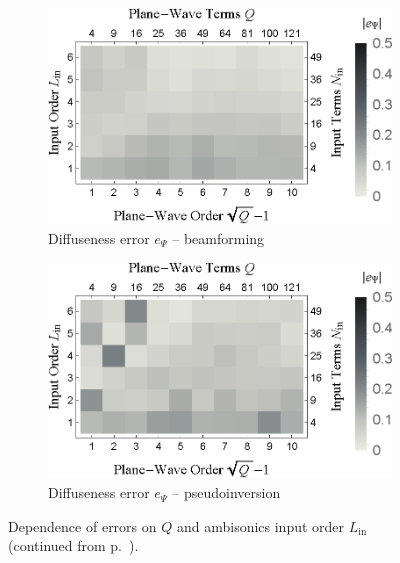 \begin{figure}[t]
	\vspace{0.5cm}
	\begin{subfigure}[b]{0.49\textwidth}
        		\includegraphics[width=\textwidth]{07_characterization_extrapolation/figures/merimaa2005_d_order_pwt-bf.eps}
        		\caption{Diffuseness error $e_\Psi$ -- beamforming}
        		\label{fig:07_Characterization_Extrapolation:Diffuseness_Order:PWT-bf}
    	\end{subfigure}
	\hfill
    	\begin{subfigure}[b]{0.49\textwidth}
        		\includegraphics[width=\textwidth]{07_characterization_extrapolation/figures/merimaa2005_d_order_pwt-pinv.eps}
        		\caption{Diffuseness error $e_\Psi$ -- pseudoinversion}
        		\label{fig:07_Characterization_Extrapolation:Diffuseness_Order:PWT-pinv}
    	\end{subfigure}
	
    	\caption[]{Dependence of errors on $Q$ and ambisonics input order $L_\text{in}$ (continued from p.~\pageref{fig:07_Characterization_Extrapolation:PWT_Order_Dependence}).}
    	\label{fig:07_Characterization_Extrapolation:PWT_Order_Dependence:contd}
\end{figure}

